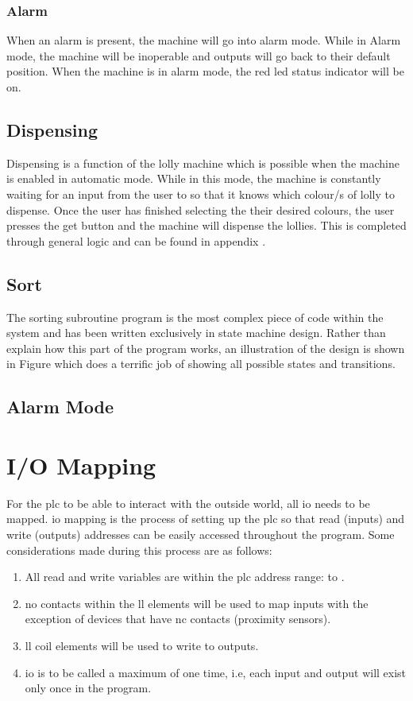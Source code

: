         \subsubsection{Alarm}
            When an alarm is present, the machine will go into alarm mode. While in Alarm mode, the machine will be inoperable and outputs will go back to their default position. When the machine is in alarm mode, the red \acrshort{led} status indicator will be on.

    \subsection{Dispensing}
        Dispensing is a function of the lolly machine which is possible when the machine is enabled in automatic mode. While in this mode, the machine is constantly waiting for an input from the user to so that it knows which colour/s of lolly to dispense. Once the user has finished selecting the their desired colours, the user presses the get button and the machine will dispense the lollies. This is completed through general logic and can be found in appendix .
    \subsection{Sort}
        The sorting subroutine program is the most complex piece of code within the system and has been written exclusively in state machine design. Rather than explain how this part of the program works, an illustration of the design is shown in Figure which does a terrific job of showing all possible states and transitions. 
    \subsection{Alarm Mode}

\section{I/O Mapping}
    For the \acrshort{plc} to be able to interact with the outside world, all \acrshort{io} needs to be mapped. \acrshort{io} mapping is the process of setting up the \acrshort{plc} so that read (inputs) and write (outputs) addresses can be easily accessed throughout the program. Some considerations made during this process are as follows:
    
    \begin{enumerate}
        \item All read and write variables are within the \acrshort{plc} address range: \X to \X. 
        \item \acrshort{no} contacts within the \acrshort{ll} elements will be used to map inputs with the exception of devices that have \acrshort{nc} contacts (proximity sensors).
        \item \acrshort{ll} coil elements will be used to write to outputs. 
        \item \acrshort{io} is to be called a maximum of one time, i.e, each input and output will exist only once in the program.
    \end{enumerate}

